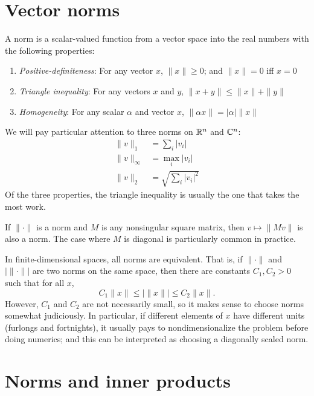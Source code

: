 \documentclass[12pt, leqno]{article}
\begin{document}

\section*{Vector norms}

A norm is a scalar-valued function from a vector space into the real
numbers with the following properties:
\begin{enumerate}
\item {\em Positive-definiteness}: For any vector $x$, $\|x\| \geq 0$;
  and $\|x\| = 0$ iff $x = 0$
\item {\em Triangle inequality}: For any vectors $x$ and $y$, 
  $\|x + y\| \leq \|x\| + \|y\|$
\item {\em Homogeneity}: For any scalar $\alpha$ and vector $x$, 
  $\| \alpha x \| = |\alpha| \|x\|$
\end{enumerate}
We will pay particular attention to three norms on $\mathbb{R}^n$ and $\mathbb{C}^n$:
\begin{align*}
  \|v\|_1 & = \sum_{i} |v_i| \\
  \|v\|_{\infty} & = \max_{i} |v_i| \\
  \|v\|_2 & = \sqrt{\sum_i |v_i|^2}
\end{align*}
Of the three properties, the triangle inequality is usually the one
that takes the most work.

If $\| \cdot \|$ is a norm and $M$ is any nonsingular square matrix,
then $v \mapsto \|Mv\|$ is also a norm.  The case where $M$ is
diagonal is particularly common in practice.

In finite-dimensional spaces, all norms are equivalent.  That is, if
$\|\cdot\|$ and $|\| \cdot \||$ are two norms on the same space, then
there are constants $C_1, C_2 > 0$ such that for all $x$,
\[
  C_1 \|x\| \leq |\|x\|| \leq C_2 \|x\|.
\]
However, $C_1$ and $C_2$ are not necessarily small, so it makes sense
to choose norms somewhat judiciously.  In particular, if different
elements of $x$ have different units (furlongs and fortnights), it
usually pays to nondimensionalize the problem before doing numerics;
and this can be interpreted as choosing a diagonally scaled norm.

\section*{Norms and inner products}
\end{document}
